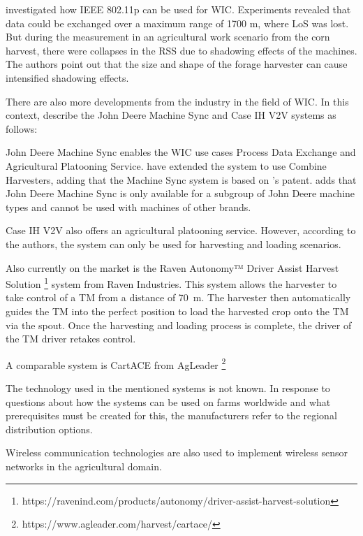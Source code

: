 \textcite{klingler_agriculture_2018} investigated how IEEE 802.11p can be used for \ac{WIC}. Experiments revealed
that data could be exchanged over a maximum range of 1700 m, where \ac{LoS} was lost. But during the
measurement in an agricultural work scenario from the corn harvest, there were collapses in the \ac{RSS}
due to shadowing effects of the machines. The authors point out that the size and shape of the forage harvester
can cause intensified shadowing effects.

There are also more developments from the industry in the field of \ac{WIC}. In this context, \textcite{thomasson_review_2018} describe the John Deere Machine Sync and Case IH V2V systems as follows:

John Deere Machine Sync enables the \ac{WIC} use cases Process Data Exchange and Agricultural Platooning Service. \textcite{liu_automation_2022} have extended the system to use Combine Harvesters, adding that the Machine Sync system is based on \textcite{metzler_system_2006}'s patent.
\textcite{smolnik_5g_2020} adds that John Deere Machine Sync is only available for a subgroup of John Deere machine types and cannot be used with machines of other brands.

Case IH V2V also offers an agricultural platooning service. However, according to the authors, the system can only be used for harvesting and loading scenarios.

Also currently on the market is the Raven Autonomy™ Driver Assist Harvest Solution \footnote{https://ravenind.com/products/autonomy/driver-assist-harvest-solution} system from Raven Industries. This system allows the harvester to take control of a \ac{TM} from a distance of \SI{70}{\metre}. The harvester then automatically guides the \ac{TM} into the perfect position to load the harvested crop onto the \ac{TM} via the spout. Once the harvesting and loading process is complete, the driver of the \ac{TM} driver retakes control.

A comparable system is CartACE from AgLeader \footnote{https://www.agleader.com/harvest/cartace/}

The technology used in the mentioned systems is not known. In response to questions about how the systems can be used on farms worldwide and what prerequisites must be created for this, the manufacturers refer to the regional distribution options.

Wireless communication technologies are also used to implement wireless sensor networks in the agricultural domain.

